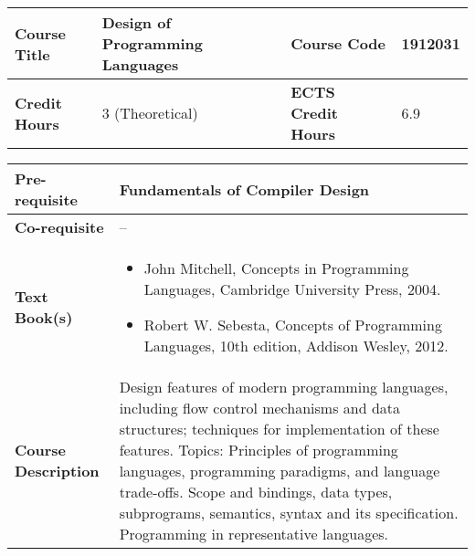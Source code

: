 \documentclass[12pt]{article}
\begin{document}
\begin{minipage}{\textwidth}
\begin{tabularx}{\textwidth}{|l|X|l|X|}
\hline
\textbf{Course Title}       &  Design of Programming Languages & \textbf{Course Code}       &   1912031 \\ \hline
\textbf{Credit Hours}       &  3 (Theoretical) & \textbf{ECTS Credit Hours}       &   6.9 \\ \hline
\end{tabularx}

\begin{tabularx}{\textwidth}{|l|X|}
\hline
\textbf{Pre-requisite}      &  Fundamentals of Compiler Design \\ \hline
\textbf{Co-requisite}       &  -- \\ \hline
\textbf{Text Book(s)}      & \begin{minipage}{.70\textwidth}
					\begin{itemize} \itemsep-0.4em
						\vspace{3mm}
						\item John Mitchell, Concepts in Programming Languages, Cambridge University Press, 2004.
						\item Robert W. Sebesta, Concepts of Programming Languages, 10th edition, Addison Wesley, 2012.
						\vspace{3mm}
					\end{itemize}
				\end{minipage}  \\ \hline
\textbf{Course Description} & \begin{minipage}{.70\textwidth}
					\vspace{3mm}
					Design features of modern programming languages, including flow control
					mechanisms and data structures; techniques for implementation of these features. Topics: Principles of programming languages, programming paradigms, and language trade-offs. Scope
					and bindings, data types, subprograms, semantics, syntax and its specification. Programming in
					representative languages.

					\vspace{3mm}
					\end{minipage} \\ \hline
\end{tabularx}
\end{minipage}


\bigskip
\bigskip
\end{document}
